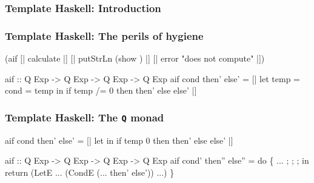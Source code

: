 \documentclass[hyperref={bookmarks=false}]{beamer}
\begin{document}
\begin{frame}[fragile]
\frametitle<1>{Template Haskell: Introduction}
\frametitle<2>{Template Haskell: The perils of hygiene}
\begin{semiverbatim}
{\textdollar}(aif [| calculate |]
  [| putStrLn (show ) |]
  [| error "does not compute" |])

aif :: Q Exp -> Q Exp -> Q Exp -> Q Exp
aif cond then' else' =
  [| let temp = {\textdollar}cond
          = temp
     in if temp /= 0 then {\textdollar}then' else {\textdollar}else' |]
\end{semiverbatim}

\end{frame}

\begin{frame}[fragile]
\frametitle{Template Haskell: The \texttt{Q} monad}
\begin{semiverbatim}
aif cond then' else' =
  [| let 
         \text{\color{blue}{it = temp}}
     in if temp \text{\color{red}{/=}} 0 then {\textdollar}then' else {\textdollar}else' |]

aif :: Q Exp -> Q Exp -> Q Exp -> Q Exp
aif cond' then'' else'' =
    do \{ ...
       ; \text{\color{blue}{temp <- newName "temp"}}
       ; \text{\color{blue}{it <- newName "it"}}
       ; \text{\color{red}{let notEq = mkNameG_v "ghc-prim" "GHC.Classes" "/="}}
         in return (LetE ... (CondE (... then' else')) ...)
       \}
\end{semiverbatim}
\end{frame}
\end{document}

